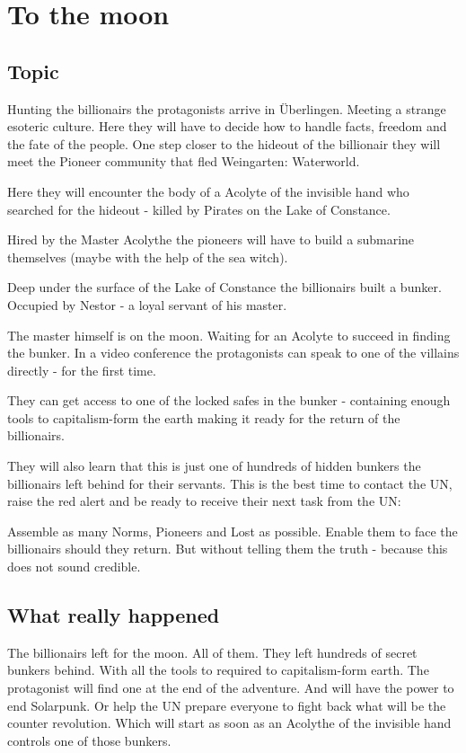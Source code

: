 
\chapter{To the moon}
\label{ch:To the moon}

\section{Topic}

Hunting the billionairs the protagonists arrive in Überlingen. Meeting a strange esoteric culture. Here they will have to decide how to handle facts, freedom and the fate of the people.
One step closer to the hideout of the billionair they will meet the Pioneer community that fled Weingarten: Waterworld.

Here they will encounter the body of a Acolyte of the invisible hand who searched for the hideout - killed by Pirates on the Lake of Constance.

Hired by the Master Acolythe the pioneers will have to build a submarine themselves (maybe with the help of the sea witch).

Deep under the surface of the Lake of Constance the billionairs built a bunker. Occupied by Nestor - a loyal servant of his master.

The master himself is on the moon. Waiting for an Acolyte to succeed in finding the bunker. In a video conference the protagonists can speak to one of the villains directly - for the first time.

They can get access to one of the locked safes in the bunker - containing enough tools to capitalism-form the earth making it ready for the return of the billionairs.

They will also learn that this is just one of hundreds of hidden bunkers the billionairs left behind for their servants. This is the best time to contact the UN, raise the red alert and be ready to receive their next task from the UN:

Assemble as many Norms, Pioneers and Lost as possible. Enable them to face the billionairs should they return. But without telling them the truth - because this does not sound credible.

\section{What really happened}

The billionairs left for the moon. All of them. They left hundreds of secret bunkers behind. With all the tools to required to capitalism-form earth. The protagonist will find one at the end of the adventure. And will have the power to end Solarpunk.
Or help the UN prepare everyone to fight back what will be the counter revolution. Which will start as soon as an Acolythe of the invisible hand controls one of those bunkers.

